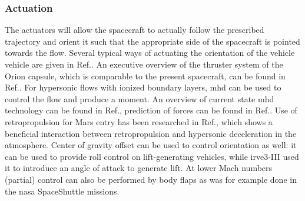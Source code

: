 \subsubsection{Actuation}
The actuators will allow the spacecraft to actually follow the prescribed trajectory and orient it such that the appropriate side of the spacecraft is pointed towards the flow. Several typical ways of actuating the orientation of the vehicle vehicle are given in Ref.\cite{Wertz2011}. An executive overview of the thruster system of the Orion capsule, which is comparable to the present spacecraft, can be found in Ref.\cite{Jones2012}. For hypersonic flows with ionized boundary layers, \gls{mhd} can be used to control the flow and produce a moment. An overview of current state \gls{mhd} technology can be found in Ref.\cite{Braun2009}, prediction of forces can be found in Ref.\cite{Kawamura2013}. Use of retropropulsion for Mars entry has been researched in Ref.\cite{Nise2011}, which shows a beneficial interaction between retropropulsion and hypersonic deceleration in the atmosphere. Center of gravity offset can be used to control orientation as well: it can be used to provide roll control on lift-generating vehicles\cite{Petsopoulos1996}, while \gls{irve3}-III used it to introduce an angle of attack to generate lift.\cite{Dillman2012a} At lower Mach numbers (partial) control can also be performed by body flaps as was for example done in the \gls{nasa} SpaceShuttle missions.